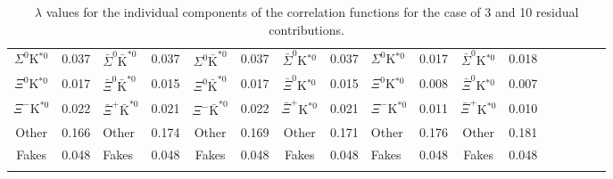 \begin{landscape}
\begin{table}[htbp]
{\begin{tabular}{|c|cV{5.0}c|cV{5.0}c|cV{5.0}c|cV{5.0}c|cV{5.0}c|c|}
  $\Sigma^{0}$K$^{*0}$ & 0.037 & $\bar{\Sigma}^{0}\bar{\mathrm{K}}^{*0}$ & 0.037 & $\Sigma^{0}\bar{\mathrm{K}}^{*0}$ & 0.037 & $\bar{\Sigma}^{0}$K$^{*0}$ & 0.037 & $\Sigma^{0}$K$^{*0}$ & 0.017 & $\bar{\Sigma}^{0}$K$^{*0}$ & 0.018 \\
  
  $\Xi^{0}$K$^{*0}$ & 0.017 & $\bar{\Xi}^{0}\bar{\mathrm{K}}^{*0}$ & 0.015 & $\Xi^{0}\bar{\mathrm{K}}^{*0}$ & 0.017 & $\bar{\Xi}^{0}$K$^{*0}$ & 0.015 & $\Xi^{0}$K$^{*0}$ & 0.008 & $\bar{\Xi}^{0}$K$^{*0}$ & 0.007 \\
  
  $\Xi^{-}$K$^{*0}$ & 0.022 & $\bar{\Xi}^{+}\bar{\mathrm{K}}^{*0}$ & 0.021 & $\Xi^{-}\bar{\mathrm{K}}^{*0}$ & 0.022 & $\bar{\Xi}^{+}$K$^{*0}$ & 0.021 & $\Xi^{-}$K$^{*0}$ & 0.011 & $\bar{\Xi}^{+}$K$^{*0}$ & 0.010 \\
  
  Other & 0.166 & Other & 0.174 & Other & 0.169 & Other & 0.171 & Other & 0.176 & Other & 0.181 \\
  
  Fakes & 0.048 & Fakes & 0.048 & Fakes & 0.048 & Fakes & 0.048 & Fakes & 0.048 & Fakes & 0.048 \\
  
 \end{tabular}}
 \caption{$\lambda$ values for the individual components of the \LamK correlation functions for the case of 3 and 10 residual contributions.}
 \label{tab:LambdaValues_All}
\end{table}

\end{landscape}
\pagestyle{plain}





